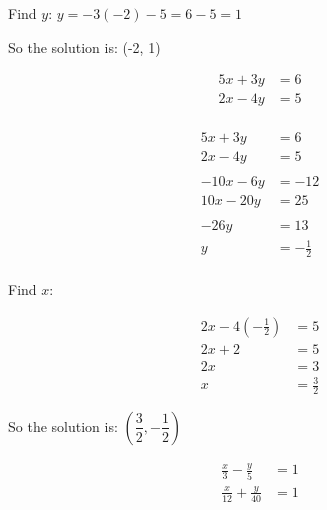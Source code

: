\documentclass[fleqn,addpoints]{exam}
\begin{document}
\begin{questions}
\begin{solution}[6 cm]
Find $y$: $y = -3(-2) - 5 = 6-5 = 1$

So the solution is: (-2, 1)

\end{solution}

\ifprintanswers
\pagebreak
\fi

\question[10] 
\begin{align*}
  5x + 3y &= 6 \\
  2x - 4y &= 5 \\
\end{align*}

\begin{solution}[8 cm]
\begin{align*}
  5x + 3y &= 6 \\
  2x - 4y &= 5 \\
  \\
  -10x - 6y &= -12 \\
  10x - 20y &= 25 \\
  \\
  -26y &= 13 \\
  y &= - \frac{1}{2} \\
\end{align*}

Find $x$: 

\begin{align*}
  2x - 4(- \frac{1}{2}) &= 5 \\
  2x + 2 &= 5 \\
  2x &= 3 \\
  x &= \frac{3}{2}
\end{align*}

So the solution is: $\left( \dfrac{3}{2}, - \dfrac{1}{2} \right)$

\end{solution}



\ifprintanswers
\else
\pagebreak
\fi

\question[10] 
\begin{align*}
  \frac{x}{3} - \frac{y}{5} &= 1 \\
  \frac{x}{12} + \frac{y}{40} &= 1 \\
\end{align*}


\end{questions}
\end{document}
